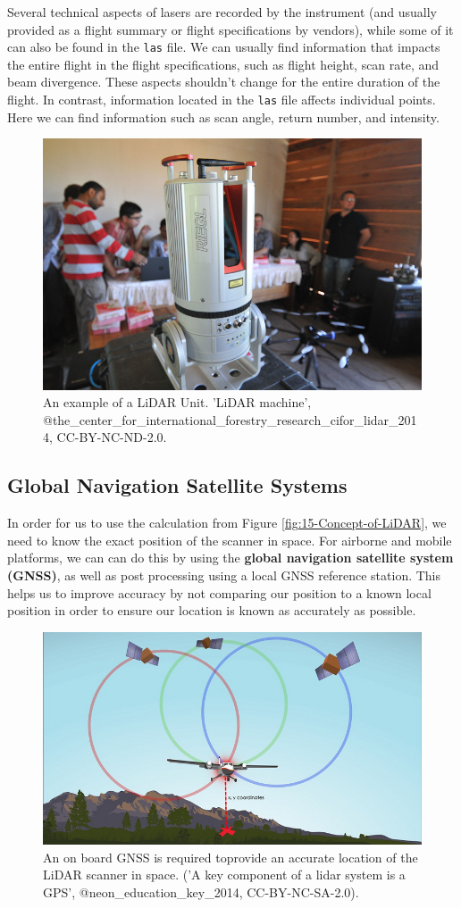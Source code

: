 \documentclass[
]{book}
\begin{document}
Several technical aspects of lasers are recorded by the instrument (and usually provided as a flight summary or flight specifications by vendors), while some of it can also be found in the \texttt{las} file. We can usually find information that impacts the entire flight in the flight specifications, such as flight height, scan rate, and beam divergence. These aspects shouldn't change for the entire duration of the flight. In contrast, information located in the \texttt{las} file affects individual points. Here we can find information such as scan angle, return number, and intensity.

\begin{figure}
\includegraphics[width=0.7\linewidth]{images/15-LiDAR-Unit} \caption{An example of a LiDAR Unit. 'LiDAR machine', @the_center_for_international_forestry_research_cifor_lidar_2014, CC-BY-NC-ND-2.0.}\label{fig:15-LiDAR-Unit}
\end{figure}

\subsection{Global Navigation Satellite Systems}\label{global-navigation-satellite-systems-1}

In order for us to use the calculation from Figure \ref{fig:15-Concept-of-LiDAR}, we need to know the exact position of the scanner in space. For airborne and mobile platforms, we can can do this by using the \textbf{global navigation satellite system (GNSS)}, as well as post processing using a local GNSS reference station. This helps us to improve accuracy by not comparing our position to a known local position in order to ensure our location is known as accurately as possible.

\begin{figure}
\includegraphics[width=0.7\linewidth]{images/15-XYZ-coordinates} \caption{An on board GNSS is required toprovide an accurate location of the LiDAR scanner in space. ('A key component of a lidar system is a GPS', @neon_education_key_2014, CC-BY-NC-SA-2.0).}\label{fig:15-XYZ-coordinates}
\end{figure}
\end{document}
